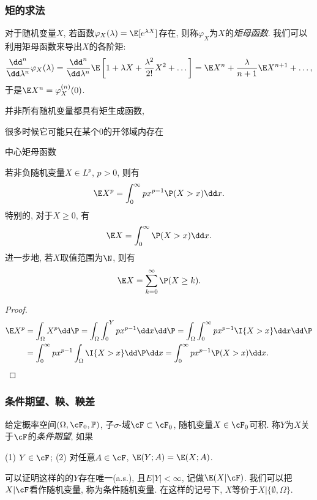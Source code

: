 \subsubsection{矩的求法}

对于随机变量$X$, 若函数$\varphi_X(\lambda) = \E[e^{\lambda X}]$存在, 则称$\varphi_X$为$X$的\emph{矩母函数}.
我们可以利用矩母函数来导出$X$的各阶矩: 
\begin{equation*}
	\frac{\dd^n}{\dd \lambda^n} \varphi_X(\lambda)
	= \frac{\dd^n}{\dd \lambda^n} \E \left[ 1 + \lambda X + \frac{\lambda^2}{2!} X^2 + \dots \right]
	= \E X^n + \frac{\lambda}{n + 1} \E X^{n+1} + \dots, 
\end{equation*}
于是$\E X^n = \varphi_X^{(n)}(0)$. 

并非所有随机变量都具有矩生成函数, 

很多时候它可能只在某个$0$的开邻域内存在

中心矩母函数


\begin{lemma}\label{lemma:trickOfExpectation}
	若非负随机变量$X \in L^p$, $p > 0$, 则有
	\begin{equation}
		\E X^p = \int_0^{\infty} p x^{p-1} \P(X > x) \dd x. 
	\end{equation}
	特别的, 对于$X \geq 0$, 有
	\begin{equation*}
		\E X = \int_0^{\infty} \P(X > x) \dd x. 
	\end{equation*}
	进一步地, 若$X$取值范围为$\N$, 则有
	\begin{equation*}
		\E X = \sum_{k=0}^{\infty} \P(X \geq k). 
	\end{equation*}
\end{lemma}
\begin{proof}
	\begin{align*}
		\E X^p 
		&= \int_\Omega X^p \dd \P 
		= \int_\Omega \int_0^Y p x^{p-1} \dd x \dd \P 
		= \int_\Omega \int_0^{\infty} p x^{p-1} \I{X > x} \dd x \dd \P \\
		&= \int_0^{\infty} p x^{p-1} \int_\Omega \I{X > x} \dd \P \dd x
		= \int_0^{\infty} p x^{p-1} \P(X > x) \dd x.
	\end{align*}
\end{proof}


\subsubsection{条件期望、鞅、鞅差}

给定概率空间$(\Omega, \cF_0, \mathbb{P})$, 子$\sigma$-域$\cF \subset \cF_0$, 随机变量$X \in \cF_0$可积. 
称$Y$为$X$关于$\cF$的\emph{条件期望}, 如果
\begin{center}
	(1) $Y \in \cF$; \quad
	(2) 对任意$A \in \cF$, $\E(Y;A) = \E(X;A)$. 
\end{center}
可以证明这样的的$Y$存在唯一(a.s.), 且$E|Y| < \infty$, 记做$\E(X|\cF)$. 
我们可以把$X | \cF$看作随机变量, 称为条件随机变量. 
在这样的记号下, $X$等价于$X | \{\emptyset, \Omega\}$. 

